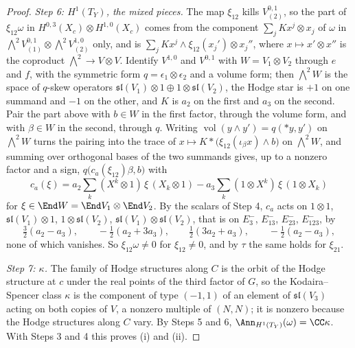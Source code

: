 \begin{proof}
\emph{Step 6: $H^{1}(T_{Y})$, the mixed pieces.} The map $\xi_{12}$ kills
$V^{0,1}_{(2)}$, so the part of $\xi_{12}\omega$ in $H^{0,3}(X_{c})\otimes
H^{1,0}(X_{c})$ comes from the component $\sum_{j}Kx^{j}\otimes x_{j}$ of
$\omega$ in ${\textstyle\bigwedge^{2}}V^{0,1}_{(1)}\otimes{\textstyle\bigwedge^{2}}
V^{1,0}_{(2)}$ only, and is $\sum_{j}Kx^{j}\wedge\xi_{12}(x_{j}')\otimes
x_{j}''$, where $x\mapsto x'\otimes x''$ is the coproduct
${\textstyle\bigwedge^{2}}\to V\otimes V$. Identify $V^{1,0}$ and $V^{0,1}$
with $W=V_{1}\otimes V_{2}$ through $e$ and $f$, with the symmetric form
$q=\epsilon_{1}\otimes\epsilon_{2}$ and a volume form; then
${\textstyle\bigwedge^{2}}W$ is the space of $q$-skew operators
$\mathfrak{sl}(V_{1})\otimes1\oplus1\otimes\mathfrak{sl}(V_{2})$, the Hodge
star is $+1$ on one summand and $-1$ on the other, and $K$ is $a_{2}$ on the
first and $a_{3}$ on the second. Pair the part above with $b\in W$ in the
first factor, through the volume form, and with $\beta\in W$ in the second,
through $q$. Writing $\operatorname{vol}(y\wedge y')=q(\ast y,y')$ on
${\textstyle\bigwedge^{2}}W$ turns the pairing into the trace of
$x\mapsto K\ast\bigl(\xi_{12}(\iota_{\beta}x)\wedge b\bigr)$ on
${\textstyle\bigwedge^{2}}W$, and summing over orthogonal bases of the two
summands gives, up to a nonzero factor and a sign,
$q\bigl(c_{a}(\xi_{12})\beta,b\bigr)$ with
\[
  c_{a}(\xi)=a_{2}\sum_{k}(X^{k}\otimes1)\,\xi\,(X_{k}\otimes1)
  -a_{3}\sum_{k}(1\otimes X^{k})\,\xi\,(1\otimes X_{k})
\]
for $\xi\in\End W=\End V_{1}\otimes\End V_{2}$.
By the scalars of Step 4, $c_{a}$ acts on $1\otimes1$, $\mathfrak{sl}(V_{1})
\otimes1$, $1\otimes\mathfrak{sl}(V_{2})$, $\mathfrak{sl}(V_{1})\otimes
\mathfrak{sl}(V_{2})$, that is on $E_{3}^{-}$, $E_{13}^{-}$, $E_{23}^{-}$,
$E_{123}^{-}$, by
\[
  \tfrac32(a_{2}-a_{3}),\qquad
  -\tfrac12(a_{2}+3a_{3}),\qquad
  \tfrac12(3a_{2}+a_{3}),\qquad
  -\tfrac12(a_{2}-a_{3}),
\]
none of which vanishes. So $\xi_{12}\omega\ne0$ for $\xi_{12}\ne0$, and by
$\tau$ the same holds for $\xi_{21}$.

\emph{Step 7: $\kappa$.} The family of Hodge structures along $C$ is the
orbit of the Hodge structure at $c$ under the real points of the third factor
of $G$, so the Kodaira--Spencer class $\kappa$ is the component of type
$(-1,1)$ of an element of $\mathfrak{sl}(V_{3})$ acting on both copies of $V$,
a nonzero multiple of $(N,N)$; it is nonzero because the Hodge structures
along $C$ vary. By Steps 5 and 6, $\Ann_{H^{1}(T_{Y})}(\omega)=\CC\kappa$.
With Steps 3 and 4 this proves (i) and (ii).


\end{proof}
